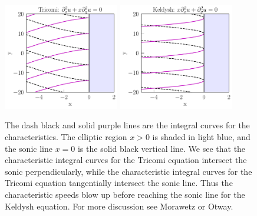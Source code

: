\documentclass{ws-ijmpd}
\begin{document}
\begin{figure}[h]
\includegraphics[width=0.45\textwidth]{tricomi_integral_curves.pdf}
\includegraphics[width=0.45\textwidth]{keldysh_integral_curves.pdf}
\caption{The dash black and solid purple lines are the
   integral curves for the characteristics. 
   The elliptic region $x>0$ is shaded in light blue, and the sonic line
   $x=0$ is the solid black vertical line.
   We see that the characteristic
   integral curves for the Tricomi equation intersect the sonic
   perpendicularly, while the characteristic integral curves
   for the Tricomi equation tangentially intersect the sonic line.
   Thus the characteristic speeds blow up before reaching
   the sonic line for the Keldysh equation.
   For more discussion see  
   Morawetz\cite{https://doi.org/10.1002/cpa.3160230404}
   or Otway\cite{otway2015elliptic}.}
   \label{fig:tricomi_keldysh_integral_curves}
\end{figure}

\end{document}
